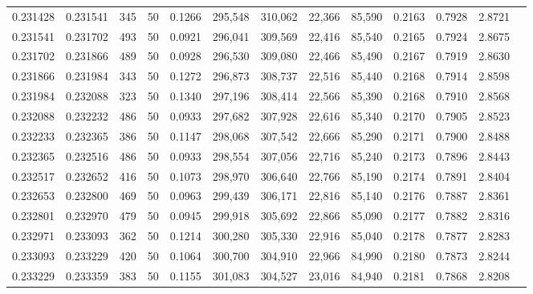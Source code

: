 \begin{tabular}{rrrrrrrrrrrrr}
0.231428 & 0.231541 &   345 &  50 &                                     0.1266 & 295,548 & 310,062 &  22,366 &  85,590 & 0.2163 & 0.7928 & 2.8721 \\
0.231541 & 0.231702 &   493 &  50 &                                     0.0921 & 296,041 & 309,569 &  22,416 &  85,540 & 0.2165 & 0.7924 & 2.8675 \\
0.231702 & 0.231866 &   489 &  50 &                                     0.0928 & 296,530 & 309,080 &  22,466 &  85,490 & 0.2167 & 0.7919 & 2.8630 \\
0.231866 & 0.231984 &   343 &  50 &                                     0.1272 & 296,873 & 308,737 &  22,516 &  85,440 & 0.2168 & 0.7914 & 2.8598 \\
0.231984 & 0.232088 &   323 &  50 &                                     0.1340 & 297,196 & 308,414 &  22,566 &  85,390 & 0.2168 & 0.7910 & 2.8568 \\
0.232088 & 0.232232 &   486 &  50 &                                     0.0933 & 297,682 & 307,928 &  22,616 &  85,340 & 0.2170 & 0.7905 & 2.8523 \\
0.232233 & 0.232365 &   386 &  50 &                                     0.1147 & 298,068 & 307,542 &  22,666 &  85,290 & 0.2171 & 0.7900 & 2.8488 \\
0.232365 & 0.232516 &   486 &  50 &                                     0.0933 & 298,554 & 307,056 &  22,716 &  85,240 & 0.2173 & 0.7896 & 2.8443 \\
0.232517 & 0.232652 &   416 &  50 &                                     0.1073 & 298,970 & 306,640 &  22,766 &  85,190 & 0.2174 & 0.7891 & 2.8404 \\
0.232653 & 0.232800 &   469 &  50 &                                     0.0963 & 299,439 & 306,171 &  22,816 &  85,140 & 0.2176 & 0.7887 & 2.8361 \\
0.232801 & 0.232970 &   479 &  50 &                                     0.0945 & 299,918 & 305,692 &  22,866 &  85,090 & 0.2177 & 0.7882 & 2.8316 \\
0.232971 & 0.233093 &   362 &  50 &                                     0.1214 & 300,280 & 305,330 &  22,916 &  85,040 & 0.2178 & 0.7877 & 2.8283 \\
0.233093 & 0.233229 &   420 &  50 &                                     0.1064 & 300,700 & 304,910 &  22,966 &  84,990 & 0.2180 & 0.7873 & 2.8244 \\
0.233229 & 0.233359 &   383 &  50 &                                     0.1155 & 301,083 & 304,527 &  23,016 &  84,940 & 0.2181 & 0.7868 & 2.8208 \\

\end{tabular}
